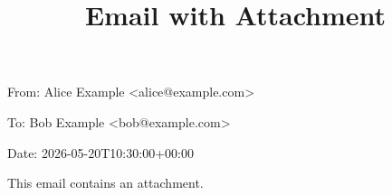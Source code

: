 \documentclass[11pt,a4paper]{article}
\title{Email with Attachment}
\begin{document}
\maketitle

From: Alice Example <alice@example.com>

To: Bob Example <bob@example.com>

Date: 2026-05-20T10:30:00+00:00

This email contains an attachment.
\end{document}
